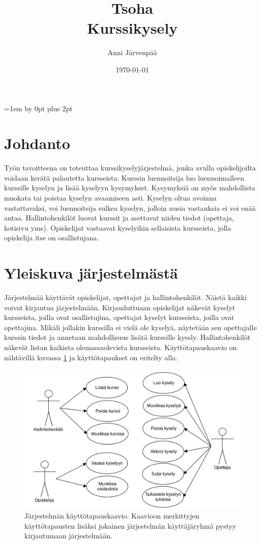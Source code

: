 \documentclass[12pt,a4paper,titlepage]{article}
\title{Tsoha\\ Kurssikysely \vspace{0.5em}}
\author{Anni Järvenpää}
\date{\today}
\begin{document}
\maketitle

\newpage
\tableofcontents
\thispagestyle{empty}
\newpage
\setcounter{page}{1}
\parskip=1em \advance\parskip by 0pt plus 2pt
\pagestyle{fancy}
\cfoot{\thepage}

\section{Johdanto}
Työn tavoitteena on toteuttaa kurssikyselyjärjestelmä, jonka avulla opiskelijoilta voidaan kerätä palautetta kursseista. Kurssin luennoitsija luo luennoimalleen kurssille kyselyn ja lisää kyselyyn kysymykset. Kysymyksiä on myös mahdollista muokata tai poistaa kyselyn avaamiseen asti. Kyselyn oltua avoinna vastattavaksi, voi luennoitsija sulkea kyselyn, jolloin uusia vastauksia ei voi enää antaa. Hallintohenkilöt luovat kurssit ja asettavat niiden tiedot (opettaja, kotisivu yms). Opiskelijat vastaavat kyselyihin sellaisista kursseista, jolla opiskelija itse on osallistujana.

\section{Yleiskuva järjestelmästä}
Järjestelmää käyttävät opiskelijat, opettajat ja hallintohenkilöt. Näistä kaikki voivat kirjautua järjestelmään. Kirjauduttuaan opiskelijat näkevät kyselyt kursseista, joilla ovat osallistujina, opettajat kyselyt kursseista, joilla ovat opettajina. Mikäli jollakin kurssilla ei vielä ole kyselyä, näytetään sen opettajalle kurssin tiedot ja annetaan mahdollisuus lisätä kurssille kyesly. Hallintohenkilöt näkevät listan kaikista olemassaolevista kursseista. Käyttö\-tapaus\-kaavio on nähtävillä kuvassa \ref{fig:kayttotapauskaavio} ja käyttötapaukset on eritelty alla.

\begin{figure}
   \centering
   \includegraphics[width=\textwidth]{kuvat/kayttotapauskaavio.png}
   \caption{Järjestelmän käyttötapauskaavio. Kaavioon merkittyjen käyttötapausten lisäksi jokainen järjestelmän käyttäjäryhmä pystyy kirjautumaan järjestelmään.}\label{fig:kayttotapauskaavio}
\end{figure}
\end{document}
